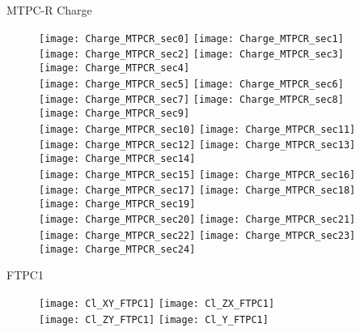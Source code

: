 \documentclass[11pt]{beamer}
\begin{document}
\begin{frame}{MTPC-R Charge}
\begin{figure}
\texttt{[image: Charge\_MTPCR\_sec0]}
\texttt{[image: Charge\_MTPCR\_sec1]}
\texttt{[image: Charge\_MTPCR\_sec2]}
\texttt{[image: Charge\_MTPCR\_sec3]}
\texttt{[image: Charge\_MTPCR\_sec4]}\\
\texttt{[image: Charge\_MTPCR\_sec5]}
\texttt{[image: Charge\_MTPCR\_sec6]}
\texttt{[image: Charge\_MTPCR\_sec7]}
\texttt{[image: Charge\_MTPCR\_sec8]}
\texttt{[image: Charge\_MTPCR\_sec9]}\\
\texttt{[image: Charge\_MTPCR\_sec10]}
\texttt{[image: Charge\_MTPCR\_sec11]}
\texttt{[image: Charge\_MTPCR\_sec12]}
\texttt{[image: Charge\_MTPCR\_sec13]}
\texttt{[image: Charge\_MTPCR\_sec14]}\\
\texttt{[image: Charge\_MTPCR\_sec15]}
\texttt{[image: Charge\_MTPCR\_sec16]}
\texttt{[image: Charge\_MTPCR\_sec17]}
\texttt{[image: Charge\_MTPCR\_sec18]}
\texttt{[image: Charge\_MTPCR\_sec19]}\\
\texttt{[image: Charge\_MTPCR\_sec20]}
\texttt{[image: Charge\_MTPCR\_sec21]}
\texttt{[image: Charge\_MTPCR\_sec22]}
\texttt{[image: Charge\_MTPCR\_sec23]}
\texttt{[image: Charge\_MTPCR\_sec24]}
\end{figure}
\end{frame}

\begin{frame}
\centering
\Huge
FTPC1
\end{frame}

\begin{frame}{}
\begin{figure}
\centering
\texttt{[image: Cl\_XY\_FTPC1]}
\texttt{[image: Cl\_ZX\_FTPC1]}\\
\texttt{[image: Cl\_ZY\_FTPC1]}
\texttt{[image: Cl\_Y\_FTPC1]}
\end{figure}
\end{frame}
\end{document}
